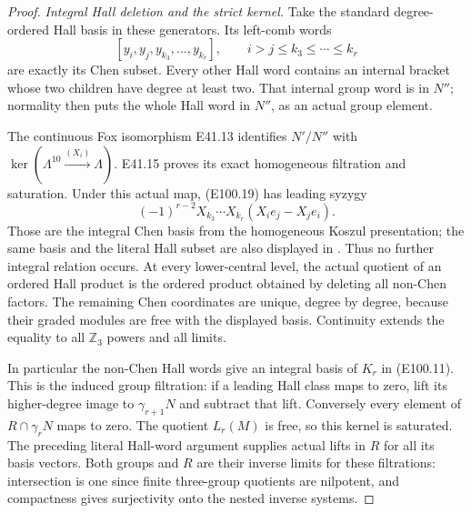 \begin{proof}
\emph{Integral Hall deletion and the strict kernel.}
Take the standard degree-ordered Hall basis
in these generators. Its left-comb words
\[
 [y_i,y_j,y_{k_3},\ldots,y_{k_r}],
                 \qquad i>j\le k_3\le\cdots\le k_r
 \tag{E100.19}
\]
are exactly its Chen subset. Every other
Hall word contains an internal bracket
whose two children have degree at least
two. That internal group word is in $N''$;
normality then puts the whole Hall word
in $N''$, as an actual group element.

The continuous Fox isomorphism E41.13
identifies $N'/N''$ with
$\ker(\Lambda^{10}\xrightarrow{(X_i)}\Lambda)$.
E41.15 proves its exact homogeneous
filtration and saturation. Under this
actual map, (E100.19) has leading syzygy
\[
 (-1)^{r-2}X_{k_3}\cdots X_{k_r}
                         (X_i e_j-X_j e_i).
\]
Those are the integral Chen basis from
the homogeneous Koszul presentation;
the same basis and the literal Hall
subset are also displayed in
\cite[\S2.4, equation(2) and the following
paragraph, p5]{E_SatohChen}.
Thus no further integral relation occurs.
At every lower-central level, the actual
quotient of an ordered Hall product is
the ordered product obtained by deleting
all non-Chen factors. The remaining
Chen coordinates are unique, degree by
degree, because their graded modules
are free with the displayed basis.
Continuity extends the equality to all
$\mathbb Z_3$ powers and all limits.

In particular the non-Chen Hall words
give an integral basis of $K_r$ in
(E100.11). This is the induced group
filtration: if a leading Hall class
maps to zero, lift its higher-degree
image to $\gamma_{r+1}N$ and subtract
that lift. Conversely every element
of $R\cap\gamma_rN$ maps to zero.
The quotient $L_r(M)$ is free, so this
kernel is saturated. The preceding
literal Hall-word argument supplies
actual lifts in $R$ for all its basis
vectors. Both groups and $R$ are their
inverse limits for these filtrations:
intersection is one since finite
three-group quotients are nilpotent,
and compactness gives surjectivity
onto the nested inverse systems.


\end{proof}

